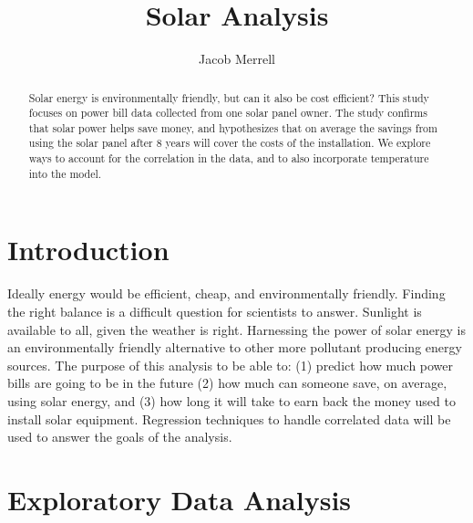 \documentclass{svproc}
\begin{document}
\mainmatter              %
%


\title{Solar Analysis}
%
%
\author{Jacob Merrell}

%

\maketitle  

\begin{abstract}
   Solar energy is environmentally friendly, but can it also be cost efficient? This study focuses on power bill data collected from one solar panel owner. The study confirms that solar power helps save money, and hypothesizes that on average the savings from using the solar panel after 8 years will cover the costs of the installation. We explore ways to account for the correlation in the data, and to also incorporate temperature into the model.   
\end{abstract}

\section{Introduction}

Ideally energy would be efficient, cheap, and environmentally friendly. Finding the right balance is a difficult question for scientists to answer. Sunlight is available to all, given the weather is right. Harnessing the power of solar energy is an environmentally friendly alternative to other more pollutant producing energy sources. The purpose of this analysis to be able to: (1) predict how much power bills are going to be in the future (2) how much can someone save, on average, using solar energy, and (3) how long it will take to earn back the money used to install solar equipment. Regression techniques to handle correlated data will be used to answer the goals of the analysis.

\section{Exploratory Data Analysis}
\end{document}
